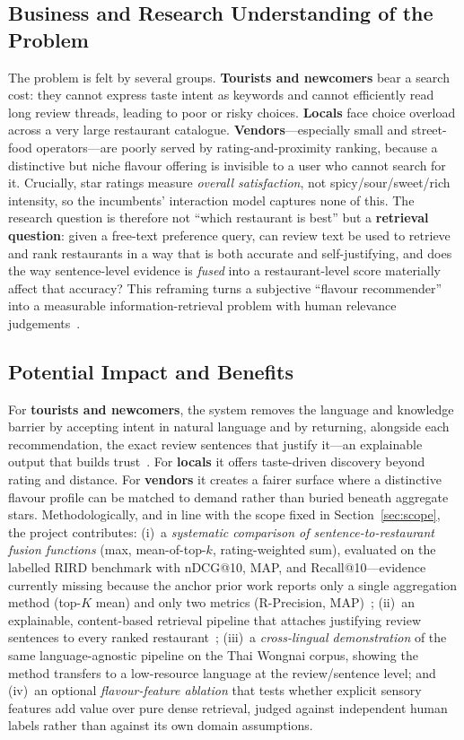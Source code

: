 \subsection{Business and Research Understanding of the Problem}
The problem is felt by several groups. \textbf{Tourists and newcomers} bear a search
cost: they cannot express taste intent as keywords and cannot efficiently read long
review threads, leading to poor or risky choices. \textbf{Locals} face choice overload
across a very large restaurant catalogue. \textbf{Vendors}---especially small and
street-food operators---are poorly served by rating-and-proximity ranking, because a
distinctive but niche flavour offering is invisible to a user who cannot search for it.
Crucially, star ratings measure \emph{overall satisfaction}, not spicy/sour/sweet/rich
intensity, so the incumbents' interaction model captures none of this. The research
question is therefore not ``which restaurant is best'' but a \textbf{retrieval
question}: given a free-text preference query, can review text be used to retrieve and
rank restaurants in a way that is both accurate and self-justifying, and does the way
sentence-level evidence is \emph{fused} into a restaurant-level score materially affect
that accuracy? This reframing turns a subjective ``flavour recommender'' into a
measurable information-retrieval problem with human relevance judgements~\cite{rird2023}.

\subsection{Potential Impact and Benefits}
For \textbf{tourists and newcomers}, the system removes the language and knowledge
barrier by accepting intent in natural language and by returning, alongside each
recommendation, the exact review sentences that justify it---an explainable output that
builds trust~\cite{zhang2020explainable}. For \textbf{locals} it offers taste-driven
discovery beyond rating and distance. For \textbf{vendors} it creates a fairer surface
where a distinctive flavour profile can be matched to demand rather than buried beneath
aggregate stars. Methodologically, and in line with the scope fixed in
Section~\ref{sec:scope}, the project contributes: (i)~a \emph{systematic comparison of
sentence-to-restaurant fusion functions} (max, mean-of-top-$k$, rating-weighted sum),
evaluated on the labelled RIRD benchmark with nDCG@10, MAP, and Recall@10---evidence
currently missing because the anchor prior work reports only a single aggregation
method (top-$K$ mean) and only two metrics (R-Precision, MAP)~\cite{rird2023};
(ii)~an explainable, content-based retrieval pipeline that attaches justifying review
sentences to every ranked restaurant~\cite{zhang2020explainable,kostric2024usage};
(iii)~a \emph{cross-lingual demonstration} of the same language-agnostic pipeline on
the Thai Wongnai corpus, showing the method transfers to a low-resource language at the
review/sentence level; and (iv)~an optional \emph{flavour-feature ablation} that tests
whether explicit sensory features add value over pure dense retrieval, judged against
independent human labels rather than against its own domain assumptions.

